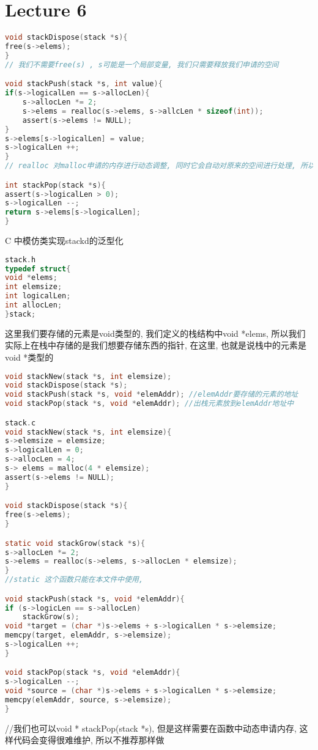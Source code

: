 \documentclass{article}
\begin{document}
\section{Lecture 6}
\begin{lstlisting}[language = C]
void stackDispose(stack *s){
free(s->elems);
}
// 我们不需要free(s) , s可能是一个局部变量, 我们只需要释放我们申请的空间

void stackPush(stack *s, int value){
if(s->logicalLen == s->allocLen){
	s->allocLen *= 2;
	s->elems = realloc(s->elems, s->allcLen * sizeof(int));
	assert(s->elems != NULL);
}
s->elems[s->logicalLen] = value;
s->logicalLen ++;
}
// realloc 对malloc申请的内存进行动态调整, 同时它会自动对原来的空间进行处理, 所以不需要我们手动处理

int stackPop(stack *s){
assert(s->logicalLen > 0);
s->logicalLen --;
return s->elems[s->logicalLen];
}
\end{lstlisting}

C 中模仿类实现stackd的泛型化
\begin{lstlisting}[language = C]
stack.h
typedef struct{
void *elems;
int elemsize;
int logicalLen;
int allocLen;
}stack;
\end{lstlisting}
这里我们要存储的元素是void类型的, 我们定义的栈结构中void *elems, 所以我们实际上在栈中存储的是我们想要存储东西的指针, 在这里, 也就是说栈中的元素是void *类型的

\begin{lstlisting}[language = C]
void stackNew(stack *s, int elemsize);
void stackDispose(stack *s);
void stackPush(stack *s, void *elemAddr); //elemAddr要存储的元素的地址
void stackPop(stack *s, void *elemAddr); //出栈元素放到elemAddr地址中

stack.c
void stackNew(stack *s, int elemsize){
s->elemsize = elemsize;
s->logicalLen = 0;
s->allocLen = 4;
s-> elems = malloc(4 * elemsize);
assert(s->elems != NULL);
}

void stackDispose(stack *s){
free(s->elems);
}

static void stackGrow(stack *s){
s->allocLen *= 2;
s->elems = realloc(s->elems, s->allocLen * elemsize);
}
//static 这个函数只能在本文件中使用, 

void stackPush(stack *s, void *elemAddr){
if (s->logicLen == s->allocLen)
	stackGrow(s);
void *target = (char *)s->elems + s->logicalLen * s->elemsize;
memcpy(target, elemAddr, s->elemsize);
s->logicalLen ++;
}

void stackPop(stack *s, void *elemAddr){
s->logicalLen --;
void *source = (char *)s->elems + s->logicalLen * s->elemsize;
memcpy(elemAddr, source, s->elemsize);
}
\end{lstlisting}
//我们也可以void * stackPop(stack *s), 但是这样需要在函数中动态申请内存, 这样代码会变得很难维护, 所以不推荐那样做
\end{document}
